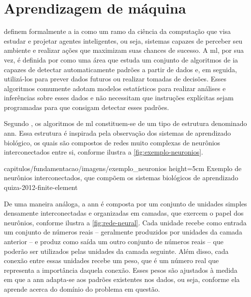 \section{Aprendizagem de máquina}
\label{sec:am}

 definem formalmente a \acrfull{ia} como um ramo da ciência da computação que visa estudar e projetar agentes inteligentes, ou seja, sistemas capazes de perceber seu ambiente e realizar ações que maximizam suas chances de sucesso.
A \acrfull{ml}, por sua vez, é definida por  como uma área que estuda um conjunto de algoritmos de \acrshort{ia} capazes de detectar automaticamente padrões a partir de dados e, em seguida, utilizá-los para prever dados futuros ou realizar tomadas de decisões.
Esses algoritmos comumente adotam modelos estatísticos para realizar análises e inferências sobre esses dados e não necessitam que instruções explícitas sejam programadas para que consigam detectar esses padrões.


Segundo , os algoritmos de \acrshort{ml} constituem-se de um tipo de estrutura denominado \acrfull{ann}. Essa estrutura é inspirada pela observação dos sistemas de aprendizado biológico, os quais são compostos de redes muito complexas de neurônios interconectados entre si, conforme ilustra a \autoref{fig:exemplo-neuronios}.

    {capitulos/fundamentacao/imagens/exemplo_neuronios} %
    {height=5cm} %
    {Exemplo de neurônios interconectados, que compõem os sistemas biológicos de aprendizado} %
    {quiza-2012-finite-element} %

De uma maneira análoga, a \acrshort{ann} é composta por um conjunto de unidades simples densamente interconectadas e organizadas em camadas, que exercem o papel dos neurônios, conforme ilustra a \autoref{fig:rede-neural}.
Cada unidade recebe como entrada um conjunto de números reais -- geralmente produzidos por unidades da camada anterior -- e produz como saída um outro conjunto de números reais -- que poderão ser utilizados pelas unidades da camada seguinte.
Além disso, cada conexão entre essas unidades recebe um peso, que é um número real que representa a importância daquela conexão. Esses pesos são ajustados à medida em que a \acrshort{ann} adapta-se aos padrões existentes nos dados, ou seja, conforme ela aprende acerca do domínio do problema em questão.

